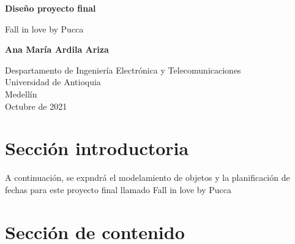 \documentclass{article}
\begin{document}
\begin{titlepage}
    \begin{center}
        \vspace*{1cm}
            
        \Huge
        \textbf{Diseño proyecto final}
            
        \vspace{0.5cm}
        \LARGE
        Fall in love by Pucca
            
        \vspace{1.5cm}
            
        \textbf{Ana María Ardila Ariza}
            
        \vfill
            
        \vspace{0.8cm}
            
        \Large
        Despartamento de Ingeniería Electrónica y Telecomunicaciones\\
        Universidad de Antioquia\\
        Medellín\\
        Octubre de 2021
            
    \end{center}
\end{titlepage}

\tableofcontents
\newpage
\section{Sección introductoria}\label{intro}
A continuación, se expndrá el modelamiento de objetos y la planificación de fechas para este proyecto final llamado Fall in love by Pucca

\section{Sección de contenido} \label{contenido}
\end{document}
